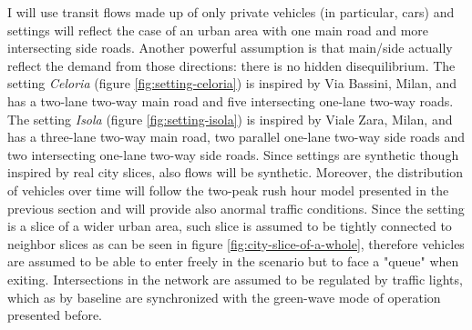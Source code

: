 I will use transit flows made up of only private vehicles (in particular, cars) and settings will reflect the case of an urban area with one main road and more intersecting side roads. Another powerful assumption is that main/side actually reflect the demand from those directions: there is no hidden disequilibrium.
The setting \textit{Celoria} (figure \ref{fig:setting-celoria}) is inspired by Via Bassini, Milan, and has a two-lane two-way main road and five intersecting one-lane two-way roads.
The setting \textit{Isola} (figure \ref{fig:setting-isola}) is inspired by Viale Zara, Milan, and has a three-lane two-way main road, two parallel one-lane two-way side roads and two intersecting one-lane two-way side roads.
Since settings are synthetic though inspired by real city slices, also flows will be synthetic. Moreover, the distribution of vehicles over time will follow the two-peak rush hour model presented in the previous section and will provide also anormal traffic conditions. Since the setting is a slice of a wider urban area, such slice is assumed to be tightly connected to neighbor slices as can be seen in figure \ref{fig:city-slice-of-a-whole}, therefore vehicles are assumed to be able to enter freely in the scenario but to face a "queue" when exiting. Intersections in the network are assumed to be regulated by traffic lights, which as by baseline are synchronized with the green-wave mode of operation presented before.

